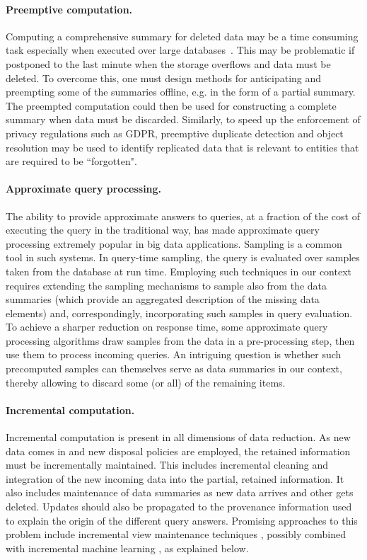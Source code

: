 \documentclass[11pt,dvipdfm]{article}
\begin{document}
\paragraph*{Preemptive computation.}
Computing a comprehensive summary for deleted data may be a time
consuming task especially when executed over
large databases~\cite{summerization}. This may be
problematic if postponed to the last minute when the storage overflows
and data must be deleted. To overcome this, one must design methods
for anticipating and preempting some of the
summaries offline, e.g. in the form of a partial summary. The preempted computation could then be used for constructing a complete summary when data must be discarded.  Similarly, to speed up the enforcement of privacy regulations such
as GDPR, preemptive duplicate detection and
object resolution may be used to identify replicated data that is relevant to entities that are required to be ``forgotten".

\paragraph*{Approximate query processing.}
The ability to provide approximate answers to queries, at a fraction
of the cost of executing the query in the traditional way, has made
approximate query processing extremely popular in big data
applications. Sampling is a common tool in such systems. In
query-time sampling, the query is evaluated over samples taken from
the database at run time. Employing such techniques in our context
requires extending the sampling mechanisms to sample also from the
data summaries (which provide an aggregated description of the
missing data elements) and, correspondingly, incorporating such
samples in query evaluation.
To achieve a sharper reduction on response time, some approximate
query processing algorithms draw samples from the data in a
pre-processing step, then use them to process incoming queries. An
intriguing question is whether such precomputed
samples can themselves serve as data summaries in our context,
thereby allowing to discard some (or all) of the remaining items.

\paragraph*{Incremental computation.}
Incremental computation is present in all
dimensions of data reduction. As new data comes in and
new disposal policies are employed, the retained information must be
incrementally maintained. This includes incremental cleaning and
integration of the new incoming data into the partial, retained
information. It also includes maintenance of data summaries as new
data arrives and other gets deleted. Updates should also be
propagated to the provenance information used to explain the origin
of the different query answers. Promising approaches to this problem include incremental view maintenance techniques \cite{incrementalviews}, possibly combined with
incremental machine learning \cite{WuDD20,WuTD20}, as explained below.
\end{document}

